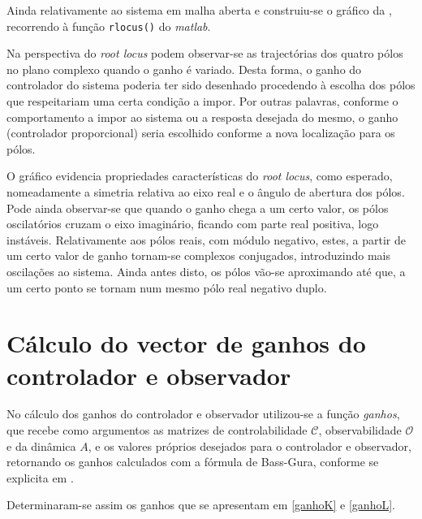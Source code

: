 \documentclass[%
  reprint,
  nofootinbib,
  amsmath,amssymb,
  aps,
  10pt,
  a4paper
]{revtex4-1}
\begin{document}
\par Ainda relativamente ao sistema em malha aberta e construiu-se o gráfico da , recorrendo à função \verb+rlocus()+ do {\it matlab}.


\par Na perspectiva do \textit{root locus} podem observar-se as trajectórias dos quatro pólos no plano complexo quando o ganho é variado. Desta forma, o ganho do controlador do sistema poderia ter sido desenhado procedendo à escolha dos pólos que respeitariam uma certa condição a impor. Por outras palavras, conforme o comportamento a impor ao sistema ou a resposta desejada do mesmo, o ganho (controlador proporcional) seria escolhido conforme a nova localização para os pólos.
\par O gráfico evidencia propriedades características do \textit{root locus}, como esperado, nomeadamente a simetria relativa ao eixo real e o ângulo de abertura dos pólos. Pode ainda observar-se que quando o ganho chega a um certo valor, os pólos oscilatórios cruzam o eixo imaginário, ficando com parte real positiva, logo instáveis. Relativamente aos pólos reais, com módulo negativo, estes, a partir de um certo valor de ganho tornam-se complexos conjugados, introduzindo mais oscilações ao sistema. Ainda antes disto, os pólos vão-se aproximando até que, a um certo ponto se tornam num mesmo pólo real negativo duplo.


\section{Cálculo do vector de ganhos do controlador e observador}
No cálculo dos ganhos do controlador e observador utilizou-se a função {\it ganhos}, que recebe como argumentos as matrizes de controlabilidade $\mathcal{C}$, observabilidade $\mathcal{O}$ e da dinâmica $A$, e os valores próprios desejados para o controlador e observador, retornando os ganhos calculados com a fórmula de Bass-Gura, conforme se explicita em .

Determinaram-se assim os ganhos que se apresentam em \eqref{ganhoK} e \eqref{ganhoL}.

\end{document}
